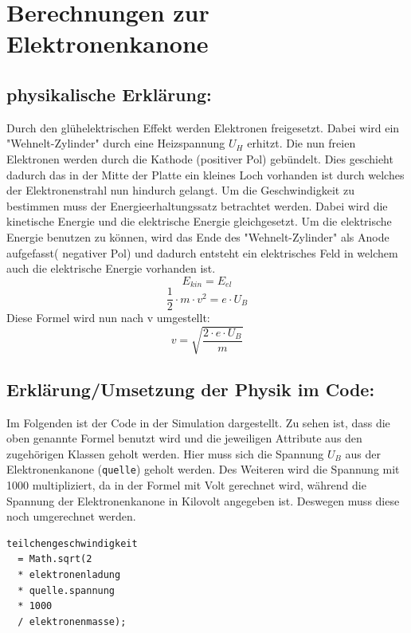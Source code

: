 \section{Berechnungen zur Elektronenkanone}

\subsection{physikalische Erklärung:}

Durch den glühelektrischen Effekt werden Elektronen freigesetzt. 
Dabei wird ein "Wehnelt-Zylinder" durch eine Heizspannung $U_H$ erhitzt.
Die nun freien Elektronen werden durch die Kathode (positiver Pol) gebündelt.
Dies geschieht dadurch das in der Mitte der Platte ein kleines Loch vorhanden ist durch welches der Elektronenstrahl nun hindurch gelangt. 
Um die Geschwindigkeit zu bestimmen muss der Energieerhaltungssatz betrachtet werden.
Dabei wird die kinetische Energie und die elektrische Energie gleichgesetzt.
Um die elektrische Energie benutzen zu können, wird das Ende des "Wehnelt-Zylinder" als Anode aufgefasst( negativer Pol) und dadurch entsteht ein elektrisches Feld in welchem auch die elektrische Energie vorhanden ist. 
$$ E_{kin} = E_{el}$$
$$ \frac{1}{2} \cdot m \cdot v^2 = e \cdot U_B$$
Diese Formel wird  nun nach v umgestellt:
\begin{equation}
\label{eq:v}
   v = \sqrt{\frac{2 \cdot e \cdot U_B}{m}} 
\end{equation}
$$ $$

\subsection{Erklärung/Umsetzung der Physik im Code:}

Im Folgenden ist der Code in der Simulation dargestellt.
Zu sehen ist, dass die oben genannte Formel benutzt wird und die jeweiligen Attribute aus den zugehörigen Klassen geholt werden.
Hier muss sich die Spannung $U_B$ aus der Elektronenkanone (\lstinline$quelle$)  geholt werden.
Des Weiteren wird die Spannung mit 1000 multipliziert, da in der Formel mit Volt gerechnet wird, während die Spannung der Elektronenkanone in Kilovolt angegeben ist. Deswegen muss diese noch umgerechnet werden.

\begin{lstlisting}
teilchengeschwindigkeit 
  = Math.sqrt(2 
  * elektronenladung 
  * quelle.spannung 
  * 1000 
  / elektronenmasse);
\end{lstlisting}

